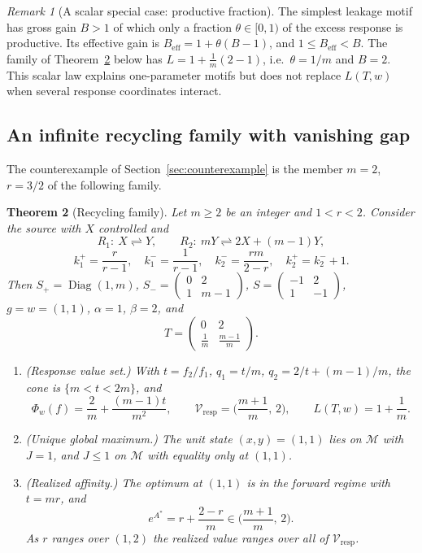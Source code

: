 \documentclass[11pt,reqno]{amsart}
\theoremstyle{plain}
\newtheorem{theorem}{Theorem}[section]
\theoremstyle{definition}
\theoremstyle{remark}
\newtheorem{remark}[theorem]{Remark}
\numberwithin{equation}{section}
\newcommand{\Diag}{\operatorname{Diag}}
\newcommand{\Sp}{S_{+}}
\newcommand{\Sm}{S_{-}}
\newcommand{\Vresp}{\mathcal{V}_{\mathrm{resp}}}
\begin{document}
\begin{remark}[A scalar special case: productive fraction]
The simplest leakage motif has gross gain $B>1$ of which only a fraction $\theta\in[0,1)$ of the excess response is productive.  Its effective gain is $B_{\mathrm{eff}}=1+\theta(B-1)$, and $1\le B_{\mathrm{eff}}<B$.  The family of Theorem~\ref{thm:family} below has $L=1+\frac1m(2-1)$, i.e.\ $\theta=1/m$ and $B=2$.  This scalar law explains one-parameter motifs but does not replace $L(T,w)$ when several response coordinates interact.
\end{remark}

\subsection{An infinite recycling family with vanishing gap}
The counterexample of Section~\ref{sec:counterexample} is the member $m=2$, $r=3/2$ of the following family.

\begin{theorem}[Recycling family]\label{thm:family}
Let $m\ge2$ be an integer and $1<r<2$.  Consider the source with $X$ controlled and
\[
R_1:\ X\rightleftharpoons Y,\qquad R_2:\ mY\rightleftharpoons 2X+(m-1)Y,
\]
\[
k^+_1=\frac{r}{r-1},\quad k^-_1=\frac1{r-1},\quad k^-_2=\frac{rm}{2-r},\quad k^+_2=k^-_2+1 .
\]
Then $\Sp=\Diag(1,m)$, $\Sm=\begin{pmatrix}0&2\\1&m-1\end{pmatrix}$, $S=\begin{pmatrix}-1&2\\1&-1\end{pmatrix}$, $g=w=(1,1)$, $\alpha=1$, $\beta=2$, and
\[
T=\begin{pmatrix}0&2\\ \tfrac1m&\tfrac{m-1}m\end{pmatrix}.
\]
\begin{enumerate}[label=(\roman*)]
\item (Response value set.)  With $t=f_2/f_1$, $q_1=t/m$, $q_2=2/t+(m-1)/m$, the cone is $\{m<t<2m\}$, and
\[
\Phi_w(f)=\frac2m+\frac{(m-1)t}{m^2},\qquad \Vresp=\Big(\frac{m+1}m,\,2\Big),\qquad L(T,w)=1+\frac1m .
\]
\item (Unique global maximum.)  The unit state $(x,y)=(1,1)$ lies on $\mathcal M$ with $J=1$, and $J\le1$ on $\mathcal M$ with equality only at $(1,1)$.
\item (Realized affinity.)  The optimum at $(1,1)$ is in the forward regime with $t=mr$, and
\[
e^{A^*}=r+\frac{2-r}m\in\Big(\frac{m+1}m,\,2\Big).
\]
As $r$ ranges over $(1,2)$ the realized value ranges over all of $\Vresp$.
\end{enumerate}
\end{theorem}
\end{document}
